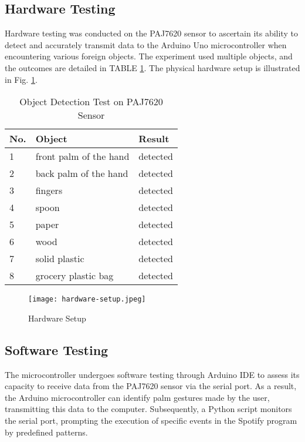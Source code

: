 \documentclass[conference,a4paper]{IEEEtran}
\begin{document}
\subsection{Hardware Testing}
Hardware testing was conducted on the PAJ7620 sensor to ascertain its ability to detect and accurately transmit data to the Arduino Uno microcontroller when encountering various foreign objects. The experiment used multiple objects, and the outcomes are detailed in TABLE \ref{table2}. The physical hardware setup is illustrated in Fig. \ref{fig:hardware-setup}.

\begin{table}[hbt!]
\centering
  \footnotesize %
  \caption{Object Detection Test on PAJ7620 Sensor}
  \begin{tabular}{p{0.5cm}p{3cm}p{1.5cm}}
     \toprule
     \normalfont No.& Object& Result\\
     \midrule
      1 & front palm of the hand& detected\\ 
      2 & back palm of the hand& detected\\
      3 & fingers& detected\\  
      4 & spoon& detected\\ 
      5 & paper& detected\\  
      6 & wood& detected\\ 
      7 & solid plastic& detected\\
      8 & grocery plastic bag& detected\\
     \bottomrule
  \end{tabular}
  \label{table2}
\end{table}

\begin{figure}[hbt!]
    \centering
    \texttt{[image: hardware-setup.jpeg]}
    \caption{Hardware Setup}
    \label{fig:hardware-setup}
\end{figure}

\subsection{Software Testing}
The microcontroller undergoes software testing through Arduino IDE to assess its capacity to receive data from the PAJ7620 sensor via the serial port. As a result, the Arduino microcontroller can identify palm gestures made by the user, transmitting this data to the computer. Subsequently, a Python script monitors the serial port, prompting the execution of specific events in the Spotify program by predefined patterns.
\end{document}
